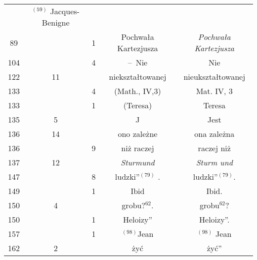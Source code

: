 \documentclass[a4paper,11pt]{article}
\begin{document}
\begin{center}
\begin{tabular}{|c|c|c|c|c|}
           & $^{ ( 59 ) }$ Jacques-Benigne \\
    89  & &  1 & Pochwała Kartezjusza & \textit{Pochwała Kartezjusza} \\
    104 & &  4 & --~Nie & Nie \\
    122 & 11 & & niekształtowanej & nieukształtowanej \\
    133 & &  4 & (Math., IV,3) & Mat. IV, 3 \\
    133 & &  1 & (Teresa) & Teresa \\
    135 &  5 & & J & Jest \\
    136 & 14 & & ono zależne & ona zależna \\
    136 & &  9 & niż raczej & raczej niż \\
    137 & 12 & & \textit{Sturmund} & \textit{Sturm und} \\
    147 & &  8 & ludzki”$^{ ( 79 ) }$ . & ludzki”$^{ ( 79 ) }$. \\
    149 & &  1 & Ibid & Ibid. \\
    150 &  4 & & grobu?$^{ 62 }$. & grobu$^{ 62 }$? \\
    150 & &  1 & Heloizy” & Heloizy”. \\
    157 & &  1 & $^{ ( 98 ) }$Jean & $^{ ( 98 ) }$ Jean \\
    162 &  2 & & żyć & żyć” \\
    \hline
  \end{tabular}






\end{center}
\end{document}
